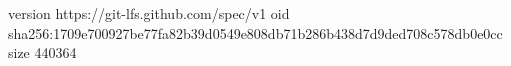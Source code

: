 version https://git-lfs.github.com/spec/v1
oid sha256:1709e700927be77fa82b39d0549e808db71b286b438d7d9ded708c578db0e0cc
size 440364
